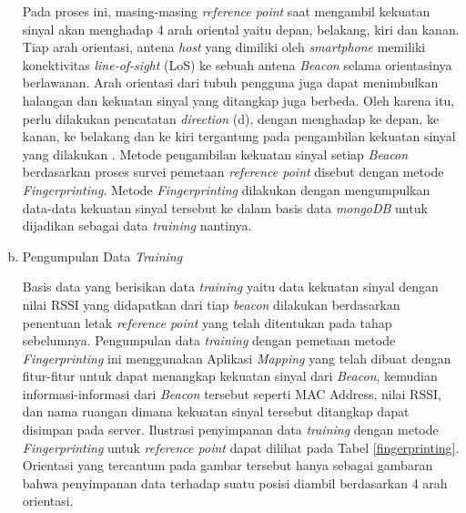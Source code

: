 \begin{enumerate}[a.]
	      \par Pada proses ini, masing-masing \textit{reference point} saat mengambil kekuatan sinyal akan menghadap 4 arah oriental yaitu depan, belakang, kiri dan kanan. Tiap arah orientasi, antena \textit{host} yang dimiliki oleh \textit{smartphone} memiliki konektivitas \textit{line-of-sight} (LoS) ke sebuah antena \textit{Beacon} selama orientasinya berlawanan. Arah orientasi dari tubuh pengguna juga dapat menimbulkan halangan dan kekuatan sinyal yang ditangkap juga berbeda. Oleh karena itu, perlu dilakukan pencatatan \textit{direction} (d), dengan menghadap ke depan, ke kanan, ke belakang dan ke kiri tergantung pada pengambilan kekuatan sinyal yang dilakukan \citep{christ1993}. Metode pengambilan kekuatan sinyal setiap \textit{Beacon} berdasarkan proses survei pemetaan \textit{reference point} disebut dengan metode \textit{Fingerprinting}. Metode \textit{Fingerprinting} dilakukan dengan mengumpulkan  data-data kekuatan sinyal tersebut ke dalam basis data \textit{mongoDB} untuk dijadikan sebagai data \textit{training} nantinya.

	\item Pengumpulan Data \textit{Training}
	      \par
	      Basis data yang berisikan data \textit {training} yaitu data kekuatan sinyal dengan nilai RSSI yang didapatkan dari tiap \textit{beacon} dilakukan berdasarkan penentuan letak \textit{reference point} yang telah ditentukan pada tahap sebelumnya. Pengumpulan data \textit{training} dengan pemetaan metode \textit{Fingerprinting} ini menggunakan Aplikasi \textit{Mapping} yang telah dibuat dengan fitur-fitur untuk dapat menangkap kekuatan sinyal dari \textit{Beacon}, kemudian informasi-informasi dari \textit{Beacon} tersebut seperti MAC Address, nilai RSSI, dan nama ruangan dimana kekuatan sinyal tersebut ditangkap dapat disimpan pada server. Ilustrasi penyimpanan data \textit{training} dengan metode \textit{Fingerprinting} untuk \textit{reference point} dapat dilihat pada Tabel \ref{fingerprinting}. Orientasi yang tercantum pada gambar tersebut hanya sebagai gambaran bahwa penyimpanan data terhadap suatu posisi diambil berdasarkan 4 arah orientasi.


\end{enumerate}
